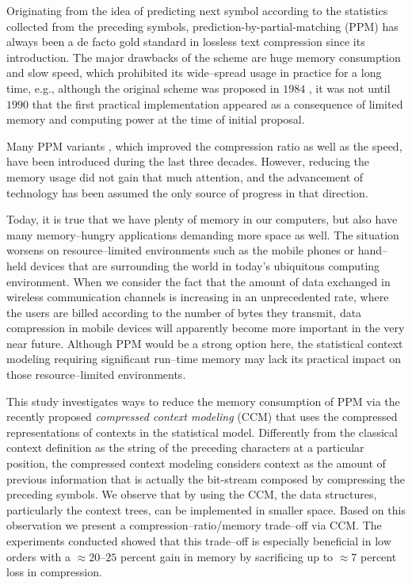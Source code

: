 \documentclass[runningheads,a4paper]{llncs}
\begin{document}
Originating from the idea of predicting next symbol according to the statistics collected from the preceding symbols, 
prediction-by-partial-matching (PPM) has always been a de facto gold standard in lossless text compression since its
introduction. 
The major drawbacks of the scheme are huge memory consumption and slow speed, which prohibited its wide--spread usage in
practice for a long time, e.g.,  although the original scheme was proposed in $1984$ \cite{CW84},
it was not until $1990$ \cite{Moffat90} that the first practical implementation appeared as a consequence of limited
memory and computing power at the time of initial proposal. 

Many PPM variants \cite{Moffat90,WB91,HV94,CTW95,Bloom98,shkarin2002ppm}, which improved the compression ratio as
well as the speed, have been introduced during the last three decades. 
However, reducing the memory usage did not gain that much attention, and the advancement of technology has been assumed
the only source of progress in that direction. 

Today, it is true that we have plenty of memory in our computers, but also have many memory--hungry applications
demanding more space as well. 
The situation worsens on resource--limited environments such as the mobile phones or hand--held devices that are
surrounding the world in today's ubiquitous computing environment. 
When we consider the fact that the amount of data exchanged in wireless communication channels is increasing in an
unprecedented rate, where the users are billed according to the number of bytes they transmit, data
compression in mobile devices will apparently become more important in the very near future. 
Although {PPM} would be a strong option here, the statistical context modeling requiring significant run--time memory
may lack its practical impact on those resource--limited environments.

This study investigates ways to reduce the memory consumption of {PPM} via the recently proposed
\emph{compressed context modeling} (CCM) \cite{Kulekci11} that uses the compressed representations of contexts in the
statistical model. 
Differently from the classical context definition  as the string  of the preceding characters at a particular position,
the compressed context modeling considers context as the  amount of previous information that is actually the
bit-stream composed by compressing the preceding symbols.  
We observe that by using the {CCM}, the data structures, particularly the context trees, can be implemented in smaller
space. Based on this observation we present a compression--ratio/memory trade--off via CCM.  The experiments
conducted
showed that this trade--off is especially beneficial in low orders with a  $\approx 20$--$25$ percent gain
in memory by sacrificing up to $\approx 7$ percent loss in compression. 
\end{document}
